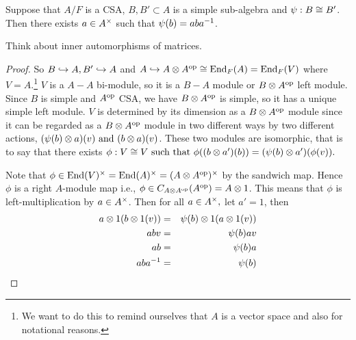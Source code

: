 \begin{theorem}\label{3.3}
Suppose that $A/F$ is a CSA, $B,B' \subset A$ is a simple sub-algebra and $\psi : B \cong B'$. Then there exists $a \in A^{\times}$ such that $\psi(b) = aba^{-1}$.
\end{theorem}
\begin{fact}
Think about inner automorphisms of matrices. 
\end{fact}
\begin{proof}
So $B \hookrightarrow A, B' \hookrightarrow A$ and $A \hookrightarrow A\otimes A^{\operatorname{op}} \cong \operatorname{End}_F(A) = \operatorname{End}_F(V)$ where $V=A.$\footnote{We want to do this to remind ourselves that $A$ is a vector space and also for notational reasons.} $V$ is a $A-A$ bi-module, so it is a $B-A$ module or $B\otimes A^{\operatorname{op}}$ left module. Since $B$ is simple and $A^{\operatorname{op}}$ CSA, we have $B \otimes A^{\operatorname{op}}$ is simple, so it has a unique simple left module. $V$ is determined by its dimension as a $B \otimes A^{\operatorname{op}}$ module since it can be regarded as a $B\otimes A^{\operatorname{op}}$ module in two different ways by two different actions, $(\psi(b) \otimes a)(v) \text{ and } (b\otimes a)(v)$. These two modules are isomorphic, that is to say that there exists $\phi : V \cong V \text{ such that } \phi((b\otimes a')(b)) = (\psi(b) \otimes a')(\phi(v)).$

Note that $\phi \in \operatorname{End}(V)^{\times} = \operatorname{End}(A)^{\times} = (A \otimes A^{\operatorname{op}})^{\times}$ by the sandwich map. Hence $\phi$ is a right $A$-module map i.e., $\phi \in C_{A\otimes A^{\operatorname{op}}}(A^{\operatorname{op}}) = A\otimes 1$. This means that $\phi$ is left-multiplication by $a \in A^{\times}$. Then for all $a \in A^{\times}, $ let $a' = 1$, then 
\begin{eqnarray*}
a\otimes 1(b\otimes 1(v)) &=& \psi(b) \otimes 1(a\otimes 1(v)) \\
abv &  = & \psi(b)av \\
ab & = & \psi(b)a \\
aba^{-1} & = & \psi(b)
\end{eqnarray*}

\end{proof}

